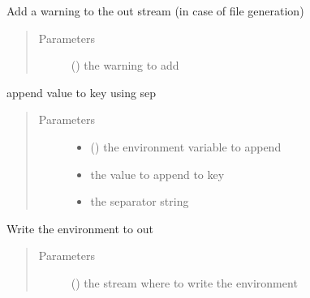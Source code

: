 \documentclass[a4paper,10pt,english]{sphinxmanual}
\begin{document}
\begin{fulllineitems}
\begin{fulllineitems}
\label{\detokenize{commands/apidoc/src:src.environment.SalomeEnviron.add_warning}}
Add a warning to the out stream (in case of file generation)
\begin{quote}\begin{description}
\item[{Parameters}] \leavevmode
{} () \textendash{} the warning to add

\end{description}\end{quote}

\end{fulllineitems}


\begin{fulllineitems}
\label{\detokenize{commands/apidoc/src:src.environment.SalomeEnviron.append}}
append value to key using sep
\begin{quote}\begin{description}
\item[{Parameters}] \leavevmode\begin{itemize}
\item {} 
 () \textendash{} the environment variable to append

\item {} 
 \textendash{} the value to append to key

\item {} 
 \textendash{} the separator string

\end{itemize}

\end{description}\end{quote}

\end{fulllineitems}


\begin{fulllineitems}
\label{\detokenize{commands/apidoc/src:src.environment.SalomeEnviron.dump}}
Write the environment to out
\begin{quote}\begin{description}
\item[{Parameters}] \leavevmode
{} () \textendash{} the stream where to write the environment


\end{description}
\end{quote}
\end{fulllineitems}
\end{fulllineitems}
\end{document}
